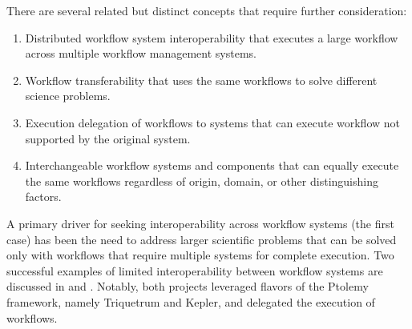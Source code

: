 There are several related but distinct concepts that require further
consideration:

\begin{enumerate}
\item Distributed workflow system interoperability that executes a
large workflow across multiple workflow management systems. 
\item Workflow transferability that uses the same workflows to solve different
science problems.
\item Execution delegation of workflows to systems that can execute workflow
not supported by the original system. 
\item Interchangeable workflow systems and components that can
equally execute the same workflows regardless of origin, domain,
or other distinguishing factors.
\end{enumerate} 

A primary driver for seeking interoperability across workflow systems (the
first case) has been the need to address larger scientific problems that can
be solved only with workflows that require multiple systems for complete
execution. Two successful examples of limited interoperability between workflow
systems are discussed in \cite{brooks_triquetrum:_2015} and
\cite{mandal_integrating_2007}. Notably, both projects leveraged flavors of the
Ptolemy framework, namely Triquetrum and Kepler, and delegated the execution of
workflows.
